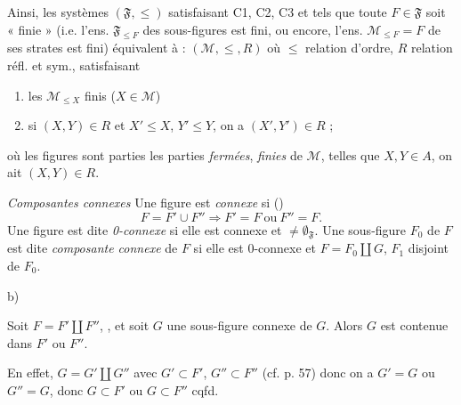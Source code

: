 \documentclass[11pt,a4paper]{article}
\begin{document}
 Ainsi, les systèmes $(\mathfrak{F}, \leq)$ satisfaisant C1, C2, C3 et tels que toute $F \in \mathfrak{F}$ soit « finie » (i.e. l'ens. $\mathfrak{F}_{\leq F}$ des sous-figures est fini, ou encore, l'ens. $\mathcal{M}_{\leq F} = F$ \struck{\ill{}} de \struck{\ill{}} ses strates est fini) équivalent à : $(\mathcal{M}, \leq, R)$ \struck{\ill{}} où $\leq$ relation d'ordre, $R$ relation réfl. et sym., satisfaisant
\begin{enumerate}
  \item[a)] les $\mathcal{M}_{\leq X}$ finis ($X \in \mathcal{M}$)
  \item[b)] si $(X,Y) \in R$ et $X' \leq X$, $Y' \leq Y$, on a $(X',Y') \in R$ ;
\end{enumerate}
où les figures sont \ill{} parties  \ill{} les parties \emph{fermées}, \emph{finies} de $\mathcal{M}$, telles que \ill{} $X, Y \in A$, on ait $(X,Y) \in R$.

\emph{Composantes connexes} \quad Une figure est \emph{connexe} si \struck{\ill{}} ()
\[
  F = F' \cup F'' \Longrightarrow F' = F \ \text{ou}\ F'' = F .
\]
Une figure est dite \emph{0-connexe} si elle est connexe et $\neq \emptyset_{\mathfrak{F}}$. Une sous-figure $F_0$ de $F$ est dite \emph{composante connexe} de $F$ si elle est 0-connexe et $F = F_0 \amalg G$,  $F_1$ disjoint de $F_0$.

b) 

  Soit $F = F' \amalg F''$, , et soit $G$ une sous-figure connexe de $G$. Alors $G$ est contenue dans $F'$ ou $F''$.


En effet, $G = G' \amalg G''$ avec $G' \subset F'$, $G'' \subset F''$  (cf. p. 57) donc on a $G' = G$ ou $G'' = G$, donc $G \subset F'$ ou $G \subset F''$ cqfd.
\end{document}
